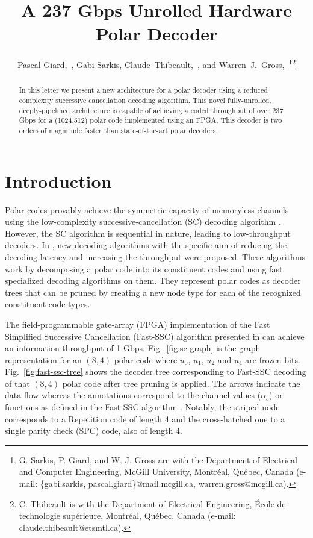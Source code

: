 \documentclass[letterpaper,onecolumn,journal,12pt]{IEEEtran}
\begin{document}
\title{A 237 Gbps Unrolled Hardware Polar Decoder}

\author{Pascal Giard,~, Gabi Sarkis, Claude~Thibeault,~, and Warren~J.~Gross,~\thanks{G. Sarkis, P. Giard, and W. J. Gross are with the Department of Electrical and Computer Engineering, McGill University, Montr\'eal, Qu\'ebec, Canada (e-mail: \{gabi.sarkis, pascal.giard\}@mail.mcgill.ca, warren.gross@mcgill.ca).}\thanks{C. Thibeault is with the Department of Electrical Engineering, \'Ecole de technologie sup\'erieure, Montr\'eal, Qu\'ebec, Canada (e-mail: claude.thibeault@etsmtl.ca).}}

\maketitle

\begin{abstract}
In this letter we present a new architecture for a polar decoder using a reduced complexity successive cancellation decoding algorithm. This novel fully-unrolled, deeply-pipelined architecture is capable of achieving a coded throughput of over 237 Gbps for a (1024,512) polar code implemented using an FPGA. This decoder is two orders of magnitude faster than state-of-the-art polar decoders.
\end{abstract}

\section{Introduction}
Polar codes provably achieve the symmetric capacity of memoryless channels using the low-complexity successive-cancellation (SC) decoding algorithm \cite{Arikan2009}. However, the SC algorithm is sequential in nature, leading to low-throughput decoders. In \cite{Alamdar-Yazdi2011,Sarkis2014}, new decoding algorithms with the specific aim of reducing the decoding latency and increasing the throughput were proposed.
These algorithms work by decomposing a polar code into its constituent codes and using fast, specialized decoding algorithms on them. They represent polar codes as decoder trees that can be pruned by creating a new node type for each of the recognized constituent code types.

The field-programmable gate-array (FPGA) implementation of the Fast Simplified Successive Cancellation (Fast-SSC) algorithm presented in \cite{Sarkis2014} can achieve an information throughput of 1 Gbps. Fig.~\ref{fig:sc-graph} is the graph representation for an $(8,4)$ polar code where $u_0$, $u_1$, $u_2$ and $u_4$ are frozen bits. Fig.~\ref{fig:fast-ssc-tree} shows the decoder tree corresponding to Fast-SSC decoding of that $(8,4)$ polar code after tree pruning is applied. The arrows indicate the data flow whereas the annotations correspond to the channel values ($\alpha_c$) or functions as defined in the Fast-SSC algorithm \cite{Sarkis2014}. Notably, the striped node corresponds to a Repetition code of length 4 and the cross-hatched one to a single parity check (SPC) code, also of length 4.
\end{document}
